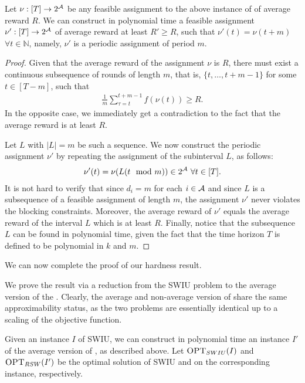 \begin{lemma}\label{lem:hardness:periodic}
Let $\nu: [T] \rightarrow 2^{\operatorname{\mathcal{A}}}$ be any feasible assignment to the above instance of \rsm of average reward $R$. We can construct in polynomial time a feasible assignment $\nu': [T] \rightarrow 2^{\operatorname{\mathcal{A}}}$ of average reward at least $R' \geq R$, such that $\nu'(t) = \nu(t + m)$ $\forall t \in \mathbb{N}$, namely, $\nu'$ is a periodic assignment of period $m$.
\end{lemma}
\begin{proof}
Given that the average reward of the assignment $\nu$ is $R$, there must exist a continuous subsequence of rounds of length $m$, that is, $\{t, \dots, t + m -1\}$ for some $t \in [T-m]$, such that
\begin{align*}
    \frac{1}{m}\sum^{t+m-1}_{\tau = t} f(\nu(t)) \geq R.
\end{align*}
In the opposite case, we immediately get a contradiction to the fact that the average reward is at least $R$.

Let $L$ with $|L| = m$ be such a sequence. We now construct the periodic assignment $\nu'$ by repeating the assignment of the subinterval $L$, as follows:
\begin{align*}
\nu'(t) = \nu(L(t \mod m)) \in 2^{\operatorname{\mathcal{A}}} ~\forall t \in [T].  
\end{align*}
It is not hard to verify that since $d_i = m$ for each $i \in \operatorname{\mathcal{A}}$ and since $L$ is a subsequence of a feasible assignment of length $m$, the assignment $\nu'$ never violates the blocking constraints. Moreover, the average reward of $\nu'$ equals the average reward of the interval $L$ which is at least $R$. Finally, notice that the subsequence $L$ can be found in polynomial time, given the fact that the time horizon $T$ is defined to be polynomial in $k$ and $m$.
\end{proof}

We can now complete the proof of our hardness result. 
\newline

We prove the result via a reduction from the SWIU problem to the average version of the \rsm. Clearly, the average and non-average version of \rsm share the same approximability status, as the two problems are essentially identical up to a scaling of the objective function. 

Given an instance $I$ of SWIU, we can construct in polynomial time an instance $I'$ of the average version of \rsm, as described above. Let $\textsc{OPT}_{SWIU}(I)$ and $\textsc{OPT}_{{RSW}}(I')$ be the optimal solution of SWIU and \rsm on the corresponding instance, respectively. 

